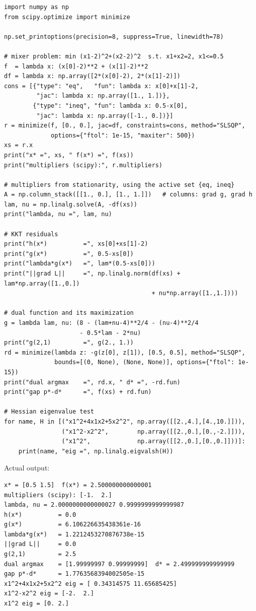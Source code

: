 \begin{lab}
\begin{verbatim}
import numpy as np
from scipy.optimize import minimize

np.set_printoptions(precision=8, suppress=True, linewidth=78)

# mixer problem: min (x1-2)^2+(x2-2)^2  s.t. x1+x2=2, x1<=0.5
f  = lambda x: (x[0]-2)**2 + (x[1]-2)**2
df = lambda x: np.array([2*(x[0]-2), 2*(x[1]-2)])
cons = [{"type": "eq",   "fun": lambda x: x[0]+x[1]-2,
         "jac": lambda x: np.array([1., 1.])},
        {"type": "ineq", "fun": lambda x: 0.5-x[0],
         "jac": lambda x: np.array([-1., 0.])}]
r = minimize(f, [0., 0.], jac=df, constraints=cons, method="SLSQP",
             options={"ftol": 1e-15, "maxiter": 500})
xs = r.x
print("x* =", xs, " f(x*) =", f(xs))
print("multipliers (scipy):", r.multipliers)

# multipliers from stationarity, using the active set {eq, ineq}
A = np.column_stack([[1., 0.], [1., 1.]])   # columns: grad g, grad h
lam, nu = np.linalg.solve(A, -df(xs))
print("lambda, nu =", lam, nu)

# KKT residuals
print("h(x*)          =", xs[0]+xs[1]-2)
print("g(x*)          =", 0.5-xs[0])
print("lambda*g(x*)   =", lam*(0.5-xs[0]))
print("||grad L||     =", np.linalg.norm(df(xs) + lam*np.array([1.,0.])
                                         + nu*np.array([1.,1.])))

# dual function and its maximization
g = lambda lam, nu: (8 - (lam+nu-4)**2/4 - (nu-4)**2/4
                     - 0.5*lam - 2*nu)
print("g(2,1)         =", g(2., 1.))
rd = minimize(lambda z: -g(z[0], z[1]), [0.5, 0.5], method="SLSQP",
              bounds=[(0, None), (None, None)], options={"ftol": 1e-15})
print("dual argmax    =", rd.x, " d* =", -rd.fun)
print("gap p*-d*      =", f(xs) + rd.fun)

# Hessian eigenvalue test
for name, H in [("x1^2+4x1x2+5x2^2", np.array([[2.,4.],[4.,10.]])),
                ("x1^2-x2^2",        np.array([[2.,0.],[0.,-2.]])),
                ("x1^2",             np.array([[2.,0.],[0.,0.]]))]:
    print(name, "eig =", np.linalg.eigvalsh(H))
\end{verbatim}
Actual output:
\begin{verbatim}
x* = [0.5 1.5]  f(x*) = 2.500000000000001
multipliers (scipy): [-1.  2.]
lambda, nu = 2.0000000000000027 0.9999999999999987
h(x*)          = 0.0
g(x*)          = 6.106226635438361e-16
lambda*g(x*)   = 1.2212453270876738e-15
||grad L||     = 0.0
g(2,1)         = 2.5
dual argmax    = [1.99999997 0.99999999]  d* = 2.499999999999999
gap p*-d*      = 1.7763568394002505e-15
x1^2+4x1x2+5x2^2 eig = [ 0.34314575 11.65685425]
x1^2-x2^2 eig = [-2.  2.]
x1^2 eig = [0. 2.]
\end{verbatim}
\end{lab}

